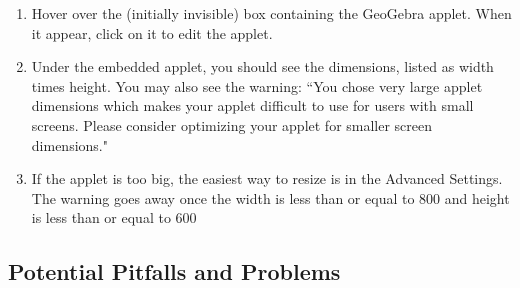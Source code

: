 \documentclass{ximera}
\begin{document}
        \begin{enumerate}
            \item Hover over the (initially invisible) box containing the GeoGebra applet. When it appear, click on it to edit the applet.
            \item Under the embedded applet, you should see the dimensions, listed as width times height. You may also see the warning:
            ``You chose very large applet dimensions which makes your applet difficult to use for users with small screens. Please consider optimizing your applet for smaller screen dimensions."
            \item If the applet is too big, the easiest way to resize is in the Advanced Settings. The warning goes away once the width is less than or equal to 800 and height is less than or equal to 600
        \end{enumerate}
        
    
    \subsection*{Potential Pitfalls and Problems}    
    
        
        
\end{document}
